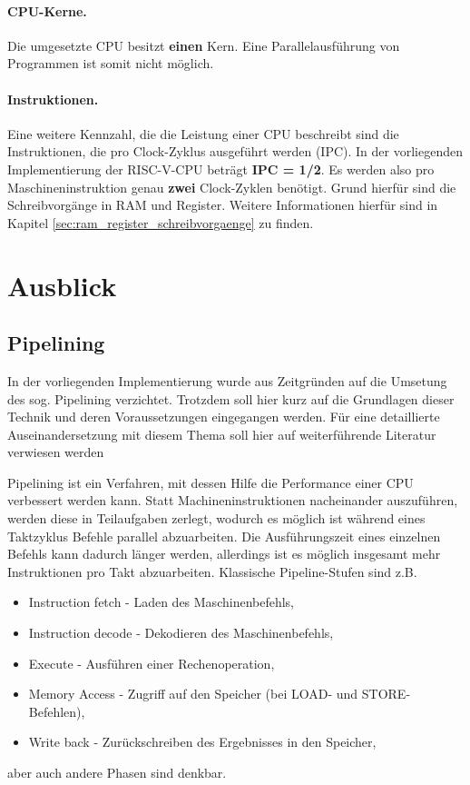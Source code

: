 \paragraph{CPU-Kerne.} Die umgesetzte CPU besitzt \textbf{einen} Kern.
Eine Parallelausführung von Programmen ist somit nicht möglich.

\paragraph{Instruktionen.} Eine weitere Kennzahl, die die Leistung einer
CPU beschreibt sind die Instruktionen, die pro Clock-Zyklus ausgeführt
werden (IPC). 
In der vorliegenden Implementierung der RISC-V-CPU beträgt \textbf{IPC =
1/2}. Es werden also pro Maschineninstruktion genau \textbf{zwei}
Clock-Zyklen benötigt. Grund hierfür sind die Schreibvorgänge in RAM und
Register. Weitere Informationen hierfür sind in Kapitel
\ref{sec:ram_register_schreibvorgaenge} zu finden.

\section{Ausblick}

\subsection{Pipelining}
In der vorliegenden Implementierung wurde aus Zeitgründen auf die Umsetung des sog. Pipelining verzichtet. 
Trotzdem soll hier kurz auf die Grundlagen dieser Technik und deren Voraussetzungen eingegangen werden.
Für eine detaillierte Auseinandersetzung mit diesem Thema soll hier auf weiterführende Literatur verwiesen werden~\cite[A-2 ff.]{Hennessy}

Pipelining ist ein Verfahren, mit dessen Hilfe die Performance einer CPU verbessert werden kann.
Statt Machineninstruktionen nacheinander auszuführen, werden diese in Teilaufgaben zerlegt, wodurch es möglich ist während eines Taktzyklus Befehle parallel abzuarbeiten.
Die Ausführungszeit eines einzelnen Befehls kann dadurch länger werden, allerdings ist es möglich insgesamt mehr Instruktionen pro Takt abzuarbeiten.
Klassische Pipeline-Stufen sind z.B.
\begin{itemize}
    \item Instruction fetch - Laden des Maschinenbefehls,
    \item Instruction decode - Dekodieren des Maschinenbefehls,
    \item Execute - Ausführen einer Rechenoperation,
    \item Memory Access - Zugriff auf den Speicher (bei LOAD- und STORE-Befehlen),
    \item Write back - Zurückschreiben des Ergebnisses in den Speicher,
\end{itemize}
aber auch andere Phasen sind denkbar.

